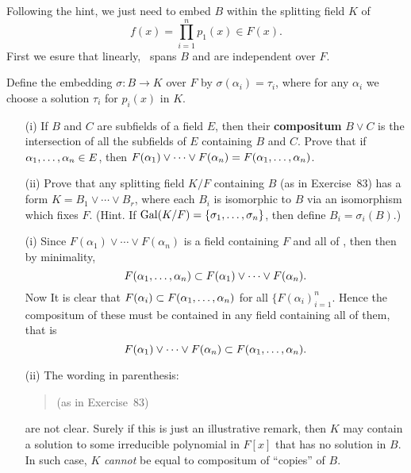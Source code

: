 \begin{myenumerate}
Following the hint, we just need to embed $B$ within
the splitting field $K$ of
\begin{equation*}
f(x)=\prod_{i=1}^n p_1(x)\in F(x).
\end{equation*}
First we esure that linearly,
\seqalphn\ spans $B$ and are independent over $F$.

Define the embedding \(\sigma : B \rightarrow K\) over $F$
by \(\sigma(\alpha_i)=\tau_i\), where
for any \(\alpha_i\) we choose a solution \(\tau_i\) for \(p_i(x)\) in $K$.




\item
\begin{excopy}
\begin{itemize}
 \item[(i)]
   If $B$ and $C$ are subfields of a field $E$, then their
   \textbf{compositum} \(B\vee C\) is the intersection of all the subfields
   of $E$ containing $B$ and $C$.
   Prove that if \(\alpha_1,\ldots,\alpha_{n}\in E\),
   then \(F(\alpha_1)\vee \cdots \vee F(\alpha_n) = F(\alpha_1,\ldots,\alpha_{n})\).
 \item[(ii)]
   Prove that any splitting field \(K/F\) containing $B$ (as in Exercise~83)
   has a form \(K = B_1 \vee \cdots \vee B_r\), where each \(B_i\)
   is isomorphic to $B$ via an isomorphism which fixes $F$.
   (Hint. If \(\mathop{\rm Gal}\nolimits(K/F)=\{\sigma_1,\ldots,\sigma_{n}\}\),
   then define \(B_i=\sigma_i(B)\).)
\end{itemize}
\end{excopy}

\begin{itemize}
 \item[(i)]
   Since \(F(\alpha_1)\vee \cdots \vee F(\alpha_n)\) is a field
   containing $F$ and all of \seqalphn, then
   then by minimality,
   \[F(\alpha_1,\ldots,\alpha_{n}) \subset F(\alpha_1)\vee \cdots \vee F(\alpha_n).\]
   Now It is clear that \(F(\alpha_i)\subset F(\alpha_1,\ldots,\alpha_{n})\)
   for all \(\{F(\alpha_i)_{i=1}^n\). Hence the compositum
   of these must be contained in any field containing all of them, that is
   \[F(\alpha_1)\vee \cdots \vee F(\alpha_n) \subset F(\alpha_1,\ldots,\alpha_{n}).\]
 \item[(ii)] \label{ex:84ii}
   The wording in parenthesis:
   \begin{quotation}
   \mldots (as in Exercise~83) \mldots
   \end{quotation}
   are not clear. Surely if this is just an illustrative remark,
   then $K$ may contain a solution to some irreducible polynomial in \(F[x]\)
   that has no solution in $B$. In such case, $K$ \emph{cannot}
   be equal to compositum of ``copies'' of $B$.


\end{itemize}
\end{myenumerate}
